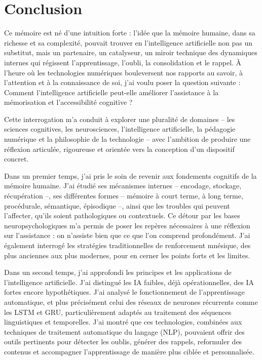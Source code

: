 \documentclass[11pt,a4paper]{report}
\begin{document}
\chapter*{Conclusion}

Ce mémoire est né d’une intuition forte : l’idée que la mémoire humaine, dans sa richesse et sa complexité, pouvait trouver en l’intelligence artificielle non pas un substitut, mais un partenaire, un catalyseur, un miroir technique des dynamiques internes qui régissent l’apprentissage, l’oubli, la consolidation et le rappel. À l’heure où les technologies numériques bouleversent nos rapports au savoir, à l’attention et à la connaissance de soi, j’ai voulu poser la question suivante : Comment l’intelligence artificielle peut-elle améliorer l’assistance à la mémorisation et l’accessibilité cognitive ?

Cette interrogation m’a conduit à explorer une pluralité de domaines – les sciences cognitives, les neurosciences, l’intelligence artificielle, la pédagogie numérique et la philosophie de la technologie – avec l’ambition de produire une réflexion articulée, rigoureuse et orientée vers la conception d’un dispositif concret.

Dans un premier temps, j’ai pris le soin de revenir aux fondements cognitifs de la mémoire humaine. J’ai étudié ses mécanismes internes – encodage, stockage, récupération –, ses différentes formes – mémoire à court terme, à long terme, procédurale, sémantique, épisodique –, ainsi que les troubles qui peuvent l’affecter, qu’ils soient pathologiques ou contextuels. Ce détour par les bases neuropsychologiques m’a permis de poser les repères nécessaires à une réflexion sur l’assistance : on n’assiste bien que ce que l’on comprend profondément. J’ai également interrogé les stratégies traditionnelles de renforcement mnésique, des plus anciennes aux plus modernes, pour en cerner les points forts et les limites.

Dans un second temps, j’ai approfondi les principes et les applications de l’intelligence artificielle. J’ai distingué les IA faibles, déjà opérationnelles, des IA fortes encore hypothétiques. J’ai analysé le fonctionnement de l’apprentissage automatique, et plus précisément celui des réseaux de neurones récurrents comme les LSTM et GRU, particulièrement adaptés au traitement des séquences linguistiques et temporelles. J’ai montré que ces technologies, combinées aux techniques de traitement automatique du langage (NLP), pouvaient offrir des outils pertinents pour détecter les oublis, générer des rappels, reformuler des contenus et accompagner l’apprentissage de manière plus ciblée et personnalisée.
\end{document}
